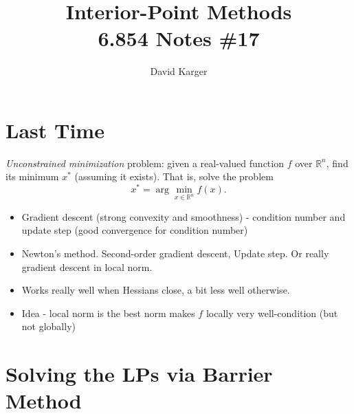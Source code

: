 \documentclass{article}
\title{Interior-Point Methods\\ 6.854 Notes \#17}
\author{David Karger}
\newcommand{\RR}{\mathbb{R}}
\begin{document}
\section{Last Time}
{\em Unconstrained minimization} problem: given a real-valued function $f$ over $\RR^n$, find its minimum $x^*$ (assuming it exists). That is, solve the problem
\[
x^*=\arg\min_{x\in \RR^n} f(x).
\]
\begin{itemize}
\item Gradient descent (strong convexity and smoothness) - condition number and update step (good convergence for condition number)
\item Newton's method. Second-order gradient descent, Update step. Or really gradient descent in local norm. 
\item Works really well when Hessians close, a bit less well otherwise. 
\item Idea - local norm is the best norm makes $f$ locally very well-condition (but not globally) 
\end{itemize}

\section{Solving the LPs via Barrier Method}
\end{document}
